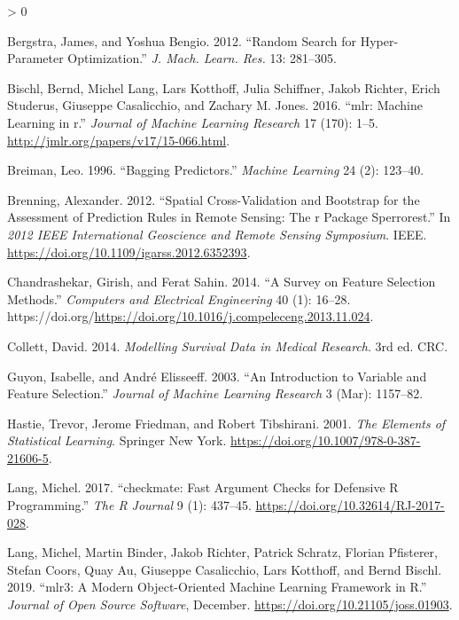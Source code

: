 \documentclass[
]{scrbook}
\newlength{\cslhangindent}
\newenvironment{CSLReferences}[2] %
 {%
  \setlength{\parindent}{0pt}
  \ifodd #1 \everypar{\setlength{\hangindent}{\cslhangindent}}\ignorespaces\fi
  \ifnum #2 > 0
  \setlength{\parskip}{#2\baselineskip}
  \fi
 }%
 {}
\begin{document}
\hypertarget{refs}{}
\begin{CSLReferences}{1}{0}
\leavevmode\hypertarget{ref-bergstra2012}{}%
Bergstra, James, and Yoshua Bengio. 2012. {``Random {Search} for {Hyper}-Parameter {Optimization}.''} \emph{J. Mach. Learn. Res.} 13: 281--305.

\leavevmode\hypertarget{ref-mlr}{}%
Bischl, Bernd, Michel Lang, Lars Kotthoff, Julia Schiffner, Jakob Richter, Erich Studerus, Giuseppe Casalicchio, and Zachary M. Jones. 2016. {``{mlr}: Machine Learning in r.''} \emph{Journal of Machine Learning Research} 17 (170): 1--5. \url{http://jmlr.org/papers/v17/15-066.html}.

\leavevmode\hypertarget{ref-Breiman1996}{}%
Breiman, Leo. 1996. {``Bagging Predictors.''} \emph{Machine Learning} 24 (2): 123--40.

\leavevmode\hypertarget{ref-brenning2012}{}%
Brenning, Alexander. 2012. {``Spatial Cross-Validation and Bootstrap for the Assessment of Prediction Rules in Remote Sensing: The r Package Sperrorest.''} In \emph{2012 {IEEE} International Geoscience and Remote Sensing Symposium}. {IEEE}. \url{https://doi.org/10.1109/igarss.2012.6352393}.

\leavevmode\hypertarget{ref-chandrashekar2014}{}%
Chandrashekar, Girish, and Ferat Sahin. 2014. {``A Survey on Feature Selection Methods.''} \emph{Computers and Electrical Engineering} 40 (1): 16--28. https://doi.org/\url{https://doi.org/10.1016/j.compeleceng.2013.11.024}.

\leavevmode\hypertarget{ref-Collett2014}{}%
Collett, David. 2014. \emph{{Modelling Survival Data in Medical Research}}. 3rd ed. CRC.

\leavevmode\hypertarget{ref-guyon2003}{}%
Guyon, Isabelle, and André Elisseeff. 2003. {``An Introduction to Variable and Feature Selection.''} \emph{Journal of Machine Learning Research} 3 (Mar): 1157--82.

\leavevmode\hypertarget{ref-hastie2001}{}%
Hastie, Trevor, Jerome Friedman, and Robert Tibshirani. 2001. \emph{The Elements of Statistical Learning}. Springer New York. \url{https://doi.org/10.1007/978-0-387-21606-5}.

\leavevmode\hypertarget{ref-checkmate}{}%
Lang, Michel. 2017. {``{checkmate: Fast Argument Checks for Defensive R Programming}.''} \emph{{The R Journal}} 9 (1): 437--45. \url{https://doi.org/10.32614/RJ-2017-028}.

\leavevmode\hypertarget{ref-mlr3}{}%
Lang, Michel, Martin Binder, Jakob Richter, Patrick Schratz, Florian Pfisterer, Stefan Coors, Quay Au, Giuseppe Casalicchio, Lars Kotthoff, and Bernd Bischl. 2019. {``{mlr3}: A Modern Object-Oriented Machine Learning Framework in {R}.''} \emph{Journal of Open Source Software}, December. \url{https://doi.org/10.21105/joss.01903}.


\end{CSLReferences}
\end{document}

